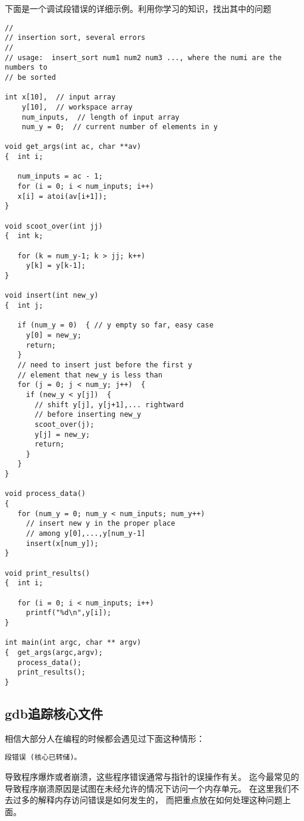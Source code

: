 下面是一个调试段错误的详细示例。利用你学习的知识，找出其中的问题
\begin{verbatim}
//
// insertion sort, several errors
//
// usage:  insert_sort num1 num2 num3 ..., where the numi are the numbers to
// be sorted

int x[10],  // input array
    y[10],  // workspace array  
    num_inputs,  // length of input array
    num_y = 0;  // current number of elements in y

void get_args(int ac, char **av)
{  int i;

   num_inputs = ac - 1;
   for (i = 0; i < num_inputs; i++)
   x[i] = atoi(av[i+1]);
}

void scoot_over(int jj)
{  int k;

   for (k = num_y-1; k > jj; k++)
     y[k] = y[k-1];
}

void insert(int new_y)
{  int j;

   if (num_y = 0)  { // y empty so far, easy case
     y[0] = new_y;
     return;
   }
   // need to insert just before the first y 
   // element that new_y is less than
   for (j = 0; j < num_y; j++)  {
     if (new_y < y[j])  {
       // shift y[j], y[j+1],... rightward 
       // before inserting new_y
       scoot_over(j);
       y[j] = new_y;
       return;
     }
   }
}

void process_data()
{
   for (num_y = 0; num_y < num_inputs; num_y++)
     // insert new y in the proper place 
     // among y[0],...,y[num_y-1]
     insert(x[num_y]);
}

void print_results()
{  int i;

   for (i = 0; i < num_inputs; i++)
     printf("%d\n",y[i]);
}

int main(int argc, char ** argv)
{  get_args(argc,argv);
   process_data();
   print_results();
}
\end{verbatim}




\subsection{gdb追踪核心文件}

相信大部分人在编程的时候都会遇见过下面这种情形：
\begin{verbatim}
段错误 (核心已转储)。
\end{verbatim}

导致程序爆炸或者崩溃，这些程序错误通常与指针的误操作有关。
迄今最常见的导致程序崩溃原因是试图在未经允许的情况下访问一个内存单元。
在这里我们不去过多的解释内存访问错误是如何发生的，
而把重点放在如何处理这种问题上面。

